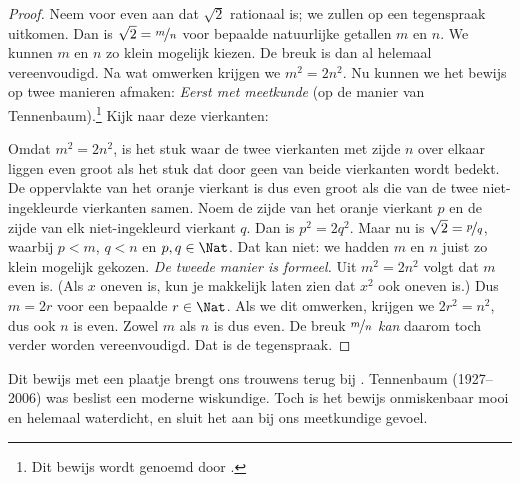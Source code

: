 \documentclass[../../../include/open-logic-section]{subfiles}
\begin{document}
\begin{proof}
Neem voor even aan dat $\sqrt{2}$ rationaal is; we zullen op een
tegenspraak uitkomen. Dan is $\sqrt{2} = \nicefrac{m}{n}$ voor
bepaalde natuurlijke getallen $m$ en $n$. We kunnen $m$ en $n$ zo
klein mogelijk kiezen. De breuk is dan al helemaal vereenvoudigd. Na
wat omwerken krijgen we $m^{2} = 2n^{2}$. Nu kunnen we het bewijs op twee manieren
afmaken:
\emph{Eerst met meetkunde} (op de manier van Tennenbaum).\footnote{Dit
bewijs wordt genoemd door \cite{Conway2006}.} Kijk naar deze vierkanten:
\begin{center}	
\end{center}
Omdat $m^2 = 2n^2$, is het stuk waar de twee vierkanten met zijde $n$
over elkaar liggen even groot als het stuk dat door geen van beide
vierkanten wordt bedekt. De oppervlakte van het oranje vierkant is dus
even groot als die van de twee niet-ingekleurde vierkanten samen. Noem de zijde van
het oranje vierkant $p$ en de zijde van elk niet-ingekleurd vierkant
$q$. Dan is $p^2 = 2q^2$. Maar nu is $\sqrt{2} = \nicefrac{p}{q}$,
waarbij $p < m$, $q < n$ en $p, q \in \Nat$. Dat kan niet: we hadden
$m$ en $n$ juist zo klein mogelijk gekozen.
\emph{De tweede manier is formeel.} Uit $m^{2} = 2n^{2}$
volgt dat $m$ even is. (Als $x$ oneven is, kun je makkelijk laten zien
dat $x^2$ ook oneven is.) Dus $m = 2r$ voor een bepaalde $r \in \Nat$. Als we dit
omwerken, krijgen we $2r^2 = n^2$,
dus ook $n$ is even. Zowel $m$ als $n$ is dus even. De breuk
$\nicefrac{m}{n}$ \emph{kan} daarom toch verder worden vereenvoudigd.
Dat is de tegenspraak.
\end{proof}
Dit bewijs met een plaatje brengt ons trouwens terug bij
. Tennenbaum (1927--2006) was beslist
een moderne wiskundige. Toch is het bewijs onmiskenbaar mooi en
helemaal waterdicht, en sluit het aan bij ons meetkundige gevoel.
\end{document}
